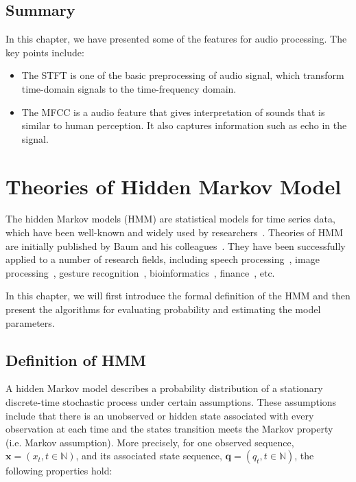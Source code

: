 \documentclass[12pt,final,twoside]{report}
\theoremstyle{plain}
\theoremstyle{definition}
\theoremstyle{remark}
\begin{document}
\section{Summary}
In this chapter, we have presented some of the features for audio processing. The key points include:
\begin{itemize}
  \item The STFT is one of the basic preprocessing of audio signal, which transform time-domain signals to the time-frequency domain.
  \item The MFCC is a audio feature that gives interpretation of sounds that is similar to human perception. It also captures information such as echo in the signal.
\end{itemize}

\cleardoublepage
\chapter{Theories of Hidden Markov Model}
The hidden Markov models (HMM) are statistical models for time series data, which have been well-known and widely used by researchers~\cite{rabiner_tutorial_1989, rabiner_fundamentals_1993}. Theories of HMM are initially published by Baum and his colleagues~\cite{baum_statistical_1966, baum_maximization_1970}. They have been successfully applied to a number of research fields, including speech processing~\cite{baker_dragon_1975, rabiner_fundamentals_1993}, image processing~\cite{chen_off-line_1994}, gesture recognition~\cite{mitra_gesture_2007}, bioinformatics~\cite{koski_hidden_2001}, finance~\cite{bhar_hidden_2004}, etc.

In this chapter, we will first introduce the formal definition of the HMM and then present the algorithms for evaluating probability and estimating the model parameters.

\section{Definition of HMM} \label{sec:hmm}
A hidden Markov model describes a probability distribution of a stationary discrete-time stochastic process under certain assumptions. These assumptions include that there is an unobserved or hidden state associated with every observation at each time and the states transition meets the Markov property (i.e. Markov assumption). More precisely, for one observed sequence, $\mathbf{x}=(x_t, t \in \mathbb{N})$, and its associated state sequence, $\mathbf{q}=(q_t, t \in \mathbb{N})$, the following properties hold:
\end{document}
